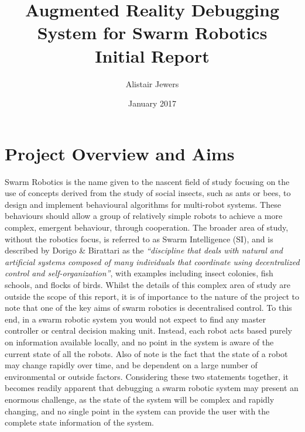 \documentclass[titlepage,hidelinks,10pt]{article}
\date{January 2017}
\title{Augmented Reality Debugging System for Swarm Robotics \vspace{1cm}\\\Large{Initial Report}}
\author{Alistair Jewers}
\begin{document}
\maketitle

\tableofcontents
\newpage

\section{Project Overview and Aims} \label{Overview}
Swarm Robotics is the name given to the nascent field of study focusing on the use of concepts derived from the study of social insects, such as ants or bees, to design and implement behavioural algorithms for multi-robot systems\cite{InspirationToApplication}. These behaviours should allow a group of relatively simple robots to achieve a more complex, emergent behaviour, through cooperation. The broader area of study, without the robotics focus, is referred to as Swarm Intelligence (SI), and is described by Dorigo \& Birattari as the \textit{``discipline that deals with natural and artificial systems composed of many individuals that coordinate using decentralized control and self-organization''}\cite{SwarmIntelligence}, with examples including insect colonies, fish schools, and flocks of birds. Whilst the details of this complex area of study are outside the scope of this report, it is of importance to the nature of the project to note that one of the key aims of swarm robotics is decentralised control. To this end, in a swarm robotic system you would not expect to find any master controller or central decision making unit. Instead, each robot acts based purely on information available locally, and no point in the system is aware of the current state of all the robots. Also of note is the fact that the state of a robot may change rapidly over time, and be dependent on a large number of environmental or outside factors. Considering these two statements together, it becomes readily apparent that debugging a swarm robotic system may present an enormous challenge, as the state of the system will be complex and rapidly changing, and no single point in the system can provide the user with the complete state information of the system. 
\end{document}
